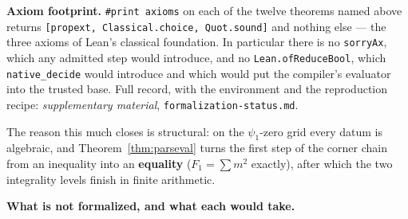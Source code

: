 \documentclass[11pt]{article}
\theoremstyle{plain}
\theoremstyle{definition}
\theoremstyle{remark}
\begin{document}
\textbf{Axiom footprint.} \texttt{\#print axioms} on each of the twelve theorems
named above returns \texttt{[propext, Classical.choice, Quot.sound]} and nothing
else --- the three axioms of Lean's classical foundation. In particular there is
no \texttt{sorryAx}, which any admitted step would introduce, and no
\texttt{Lean.ofReduceBool}, which \texttt{native\_decide} would introduce and
which would put the compiler's evaluator into the trusted base. Full record,
with the environment and the reproduction recipe: \emph{supplementary material},
\texttt{formalization-status.md}.

The reason this much closes is structural: on the $\psi_1$-zero grid every datum
is algebraic, and Theorem~\ref{thm:parseval} turns the first step of the corner
chain from an inequality into an \textbf{equality} ($F_1 = \sum m^2$ exactly),
after which the two integrality levels finish in finite arithmetic.

\textbf{What is not formalized, and what each would take.}
\end{document}
